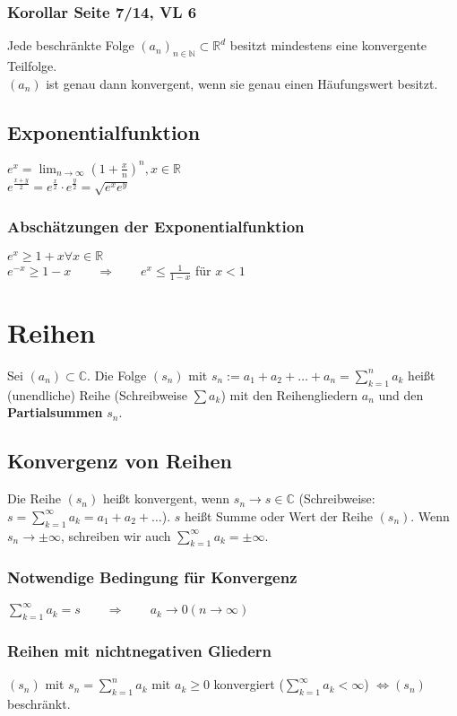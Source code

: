 \documentclass[10pt,a4paper^, twocolumn]{article}
\newcommand{\R}{\mathbb{R}}
\newcommand{\N}{\mathbb{N}}
\newcommand{\C}{\mathbb{C}}
\begin{document}
	\subsubsection{Korollar Seite 7/14, VL 6}
		Jede beschränkte Folge $(a_n)_{n \in \N} \subset \R^d$ besitzt
		mindestens eine konvergente Teilfolge.\\
		$(a_n)$ ist genau dann konvergent, wenn sie genau einen Häufungswert besitzt.	
	\subsection{Exponentialfunktion}
		$e^x = \lim_{n \to \infty} \left(1 + \frac{x}{n} \right)^n, x \in \R$\\
		$e^{\frac{x+y}{2}} = e^{\frac{x}{2}} \cdot e^{\frac{y}{2}} = \sqrt{e^xe^y}$
	\subsubsection{Abschätzungen der Exponentialfunktion}
		$e^x \geq 1 + x \forall x \in \R$\\
		$e^{-x} \geq 1 - x \qquad \Rightarrow \qquad e^x \leq \frac{1}{1-x}$ für $x < 1$ 
		

\section{Reihen}
	Sei $(a_n) \subset \C$. Die Folge $(s_n)$ mit 
	$s_n := a_1 + a_2 + \dots + a_n = \sum\limits_{k=1}^{n} a_k$ heißt (unendliche) Reihe
	(Schreibweise $\sum a_k$) mit den Reihengliedern $a_n$ und den \textbf{Partialsummen}
	$s_n$.
	\subsection{Konvergenz von Reihen}
		Die Reihe $(s_n)$ heißt konvergent, wenn $s_n \to s \in \C$
		(Schreibweise: $s = \sum\limits_{k=1}^{\infty} a_k = a_1 + a_2 + \dots$). 
		$s$ heißt Summe oder Wert der Reihe $(s_n)$.
		Wenn $s_n \to \pm \infty$, schreiben wir auch 
		$\sum\limits_{k=1}^{\infty} a_k = \pm \infty$.\\
		\subsubsection{Notwendige Bedingung für Konvergenz}
			$\sum\limits_{k=1}^{\infty} a_k = s 
			\qquad \Rightarrow \qquad 
			a_k \to 0 (n \to \infty)$
		\subsubsection{Reihen mit nichtnegativen Gliedern}
			$(s_n)$ mit $s_n = \sum\limits_{k=1}^{n} a_k$ mit $a_k \geq 0$ konvergiert 
			($\sum\limits_{k=1}^{\infty} a_k < \infty$) $\Leftrightarrow (s_n) $ beschränkt.
\end{document}

